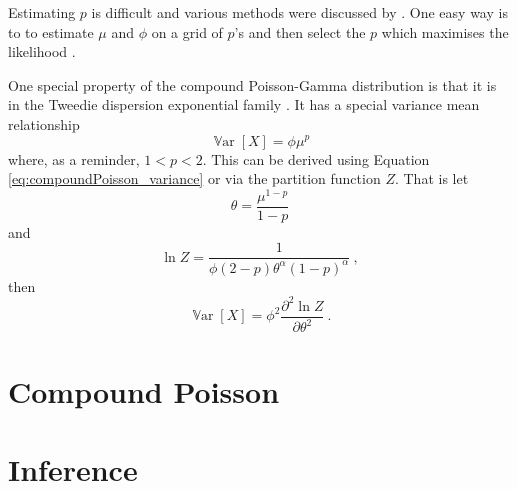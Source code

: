 \documentclass[12pt, a4paper]{memoir}
\DeclareMathOperator{\variance}{\mathbb{V}ar}
\begin{document}
Estimating $p$ is difficult and various methods were discussed by \cite{zhang2013likelihood}. One easy way is to to estimate $\mu$ and $\phi$ on a grid of $p$'s and then select the $p$ which maximises the likelihood \citep{dunn2005series}.

One special property of the compound Poisson-Gamma distribution is that it is in the Tweedie dispersion exponential family \citep{jorgensen1987exponential}. It has a special variance mean relationship
\begin{equation}
\variance[X] = \phi \mu^p
\end{equation}
where, as a reminder, $1<p<2$. This can be derived using Equation \eqref{eq:compoundPoisson_variance} or via the partition function $Z$. That is let
\begin{equation}
\theta = \frac{\mu^{1-p}}{1-p}
\end{equation}
and
\begin{equation}
\ln Z = \frac{1}{\phi(2-p)\theta^\alpha(1-p)^\alpha} \ ,
\end{equation}
then
\begin{equation}
\variance[X] = \phi^2 \frac{\partial^2\ln Z}{\partial\theta^2} \ .
\end{equation}

\chapter{Compound Poisson}
\chapter{Inference}



\end{document}

